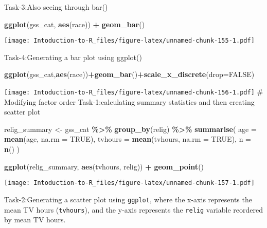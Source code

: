 \documentclass[
]{article}
\newenvironment{Shaded}{\begin{snugshade}}{\end{snugshade}}
\newcommand{\AttributeTok}[1]{\textcolor[rgb]{0.13,0.29,0.53}{#1}}
\newcommand{\ConstantTok}[1]{\textcolor[rgb]{0.56,0.35,0.01}{#1}}
\newcommand{\FunctionTok}[1]{\textcolor[rgb]{0.13,0.29,0.53}{\textbf{#1}}}
\newcommand{\NormalTok}[1]{#1}
\newcommand{\OtherTok}[1]{\textcolor[rgb]{0.56,0.35,0.01}{#1}}
\newcommand{\SpecialCharTok}[1]{\textcolor[rgb]{0.81,0.36,0.00}{\textbf{#1}}}
\begin{document}
Task-3:Also seeing through bar()

\begin{Shaded}
\begin{Highlighting}[]
\FunctionTok{ggplot}\NormalTok{(gss\_cat, }\FunctionTok{aes}\NormalTok{(race)) }\SpecialCharTok{+}
  \FunctionTok{geom\_bar}\NormalTok{()}
\end{Highlighting}
\end{Shaded}

\texttt{[image: Intoduction-to-R\_files/figure-latex/unnamed-chunk-155-1.pdf]}

Task-4:Generating a bar plot using ggplot()

\begin{Shaded}
\begin{Highlighting}[]
\FunctionTok{ggplot}\NormalTok{(gss\_cat,}\FunctionTok{aes}\NormalTok{(race))}\SpecialCharTok{+}\FunctionTok{geom\_bar}\NormalTok{()}\SpecialCharTok{+}\FunctionTok{scale\_x\_discrete}\NormalTok{(}\AttributeTok{drop=}\ConstantTok{FALSE}\NormalTok{)}
\end{Highlighting}
\end{Shaded}

\texttt{[image: Intoduction-to-R\_files/figure-latex/unnamed-chunk-156-1.pdf]}
\# Modifying factor order Task-1:calculating summary statistics and then
creating scatter plot

\begin{Shaded}
\begin{Highlighting}[]
\NormalTok{relig\_summary }\OtherTok{\textless{}{-}}\NormalTok{ gss\_cat }\SpecialCharTok{\%\textgreater{}\%}
  \FunctionTok{group\_by}\NormalTok{(relig) }\SpecialCharTok{\%\textgreater{}\%}
  \FunctionTok{summarise}\NormalTok{(}
    \AttributeTok{age =} \FunctionTok{mean}\NormalTok{(age, }\AttributeTok{na.rm =} \ConstantTok{TRUE}\NormalTok{),}
    \AttributeTok{tvhours =} \FunctionTok{mean}\NormalTok{(tvhours, }\AttributeTok{na.rm =} \ConstantTok{TRUE}\NormalTok{),}
    \AttributeTok{n =} \FunctionTok{n}\NormalTok{()}
\NormalTok{  )}

\FunctionTok{ggplot}\NormalTok{(relig\_summary, }\FunctionTok{aes}\NormalTok{(tvhours, relig)) }\SpecialCharTok{+} \FunctionTok{geom\_point}\NormalTok{()}
\end{Highlighting}
\end{Shaded}

\texttt{[image: Intoduction-to-R\_files/figure-latex/unnamed-chunk-157-1.pdf]}

Task-2:Generating a scatter plot using \texttt{ggplot}, where the x-axis
represents the mean TV hours (\texttt{tvhours}), and the y-axis
represents the \texttt{relig} variable reordered by mean TV hours.
\end{document}
